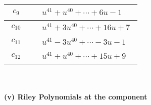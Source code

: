 \documentclass[1p]{elsarticle_modified}
\theoremstyle{definition}
\begin{document}
\begin{tabular}{m{50pt}|m{274pt}}
\hline $$\begin{aligned}c_{9}\end{aligned}$$&$\begin{aligned}
&u^{41}+u^{40}+\cdots+6 u-1
\end{aligned}$\\
\hline $$\begin{aligned}c_{10}\end{aligned}$$&$\begin{aligned}
&u^{41}+3 u^{40}+\cdots+16 u+7
\end{aligned}$\\
\hline $$\begin{aligned}c_{11}\end{aligned}$$&$\begin{aligned}
&u^{41}-3 u^{40}+\cdots-3 u-1
\end{aligned}$\\
\hline $$\begin{aligned}c_{12}\end{aligned}$$&$\begin{aligned}
&u^{41}+u^{40}+\cdots+15 u+9
\end{aligned}$\\
\hline
\end{tabular}\\~\\
\newpage\renewcommand{\arraystretch}{1}
\flushleft \textbf{(v) Riley Polynomials at the component}\newline \\
\end{document}
